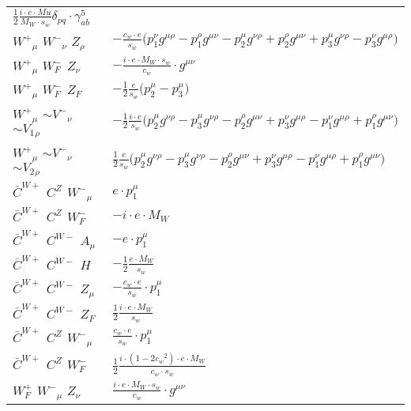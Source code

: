 \begin{center}
\begin{tabular}{|l|l|}
	$\frac{1}{2}\frac{ i \cdot e \cdot Mu}{ M_W \cdot s_w}\delta_{p q} \cdot \gamma_{a b}^5 $\\[2mm]
$W^+{}_{\mu }$ \phantom{-} $W^-{}_{\nu }$ \phantom{-} ${Z}_{\rho }$ \phantom{-}  &
	$-\frac{ c_w \cdot e}{ s_w}\big(p_1^\nu g^{\mu \rho} -p_1^\rho g^{\mu \nu} -p_2^\mu g^{\nu \rho} +p_2^\rho g^{\mu \nu} +p_3^\mu g^{\nu \rho} -p_3^\nu g^{\mu \rho} \big)$\\[2mm]
$W^+{}_{\mu }$ \phantom{-} $W^-_F{}_{}$ \phantom{-} ${Z}_{\nu }$ \phantom{-}  &
	$-\frac{ i \cdot e \cdot M_W \cdot s_w}{ c_w}\cdot g^{\mu \nu} $\\[2mm]
$W^+{}_{\mu }$ \phantom{-} $W^-_F{}_{}$ \phantom{-} $Z_F{}_{}$ \phantom{-}  &
	$-\frac{1}{2}\frac{ e}{ s_w}\big(p_2^\mu -p_3^\mu \big)$\\[2mm]
$W^+{}_{\mu }$ \phantom{-} $\sim V^-{}_{\nu }$ \phantom{-} $\sim V_1{}_{\rho }$ \phantom{-}  &
	$-\frac{1}{2}\frac{ i \cdot e}{ s_w}\big(p_2^\mu g^{\nu \rho} -p_3^\mu g^{\nu \rho} -p_2^\rho g^{\mu \nu} +p_3^\nu g^{\mu \rho} -p_1^\nu g^{\mu \rho} +p_1^\rho g^{\mu \nu} \big)$\\[2mm]
$W^+{}_{\mu }$ \phantom{-} $\sim V^-{}_{\nu }$ \phantom{-} $\sim V_2{}_{\rho }$ \phantom{-}  &
	$\frac{1}{2}\frac{ e}{ s_w}\big(p_2^\mu g^{\nu \rho} -p_3^\mu g^{\nu \rho} -p_2^\rho g^{\mu \nu} +p_3^\nu g^{\mu \rho} -p_1^\nu g^{\mu \rho} +p_1^\rho g^{\mu \nu} \big)$\\[2mm]
$\bar{C}^{W+}{}_{}$ \phantom{-} $C^{Z}{}_{}$ \phantom{-} $W^-{}_{\mu }$ \phantom{-}  &
	$ e\cdot p_1^\mu $\\[2mm]
$\bar{C}^{W+}{}_{}$ \phantom{-} $C^{Z}{}_{}$ \phantom{-} $W^-_F{}_{}$ \phantom{-}  &
	$- i \cdot e \cdot M_W$\\[2mm]
$\bar{C}^{W+}{}_{}$ \phantom{-} $C^{W-}{}_{}$ \phantom{-} ${A}_{\mu }$ \phantom{-}  &
	$- e\cdot p_1^\mu $\\[2mm]
$\bar{C}^{W+}{}_{}$ \phantom{-} $C^{W-}{}_{}$ \phantom{-} ${H}_{}$ \phantom{-}  &
	$-\frac{1}{2}\frac{ e \cdot M_W}{ s_w}$\\[2mm]
$\bar{C}^{W+}{}_{}$ \phantom{-} $C^{W-}{}_{}$ \phantom{-} ${Z}_{\mu }$ \phantom{-}  &
	$-\frac{ c_w \cdot e}{ s_w}\cdot p_1^\mu $\\[2mm]
$\bar{C}^{W+}{}_{}$ \phantom{-} $C^{W-}{}_{}$ \phantom{-} $Z_F{}_{}$ \phantom{-}  &
	$\frac{1}{2}\frac{ i \cdot e \cdot M_W}{ s_w}$\\[2mm]
$\bar{C}^{W+}{}_{}$ \phantom{-} $C^{Z}{}_{}$ \phantom{-} $W^-{}_{\mu }$ \phantom{-}  &
	$\frac{ c_w \cdot e}{ s_w}\cdot p_1^\mu $\\[2mm]
$\bar{C}^{W+}{}_{}$ \phantom{-} $C^{Z}{}_{}$ \phantom{-} $W^-_F{}_{}$ \phantom{-}  &
	$\frac{1}{2}\frac{ i \cdot (1-2 c_w {}^2) \cdot e \cdot M_W}{ c_w \cdot s_w}$\\[2mm]
$W^+_F{}_{}$ \phantom{-} $W^-{}_{\mu }$ \phantom{-} ${Z}_{\nu }$ \phantom{-}  &
	$\frac{ i \cdot e \cdot M_W \cdot s_w}{ c_w}\cdot g^{\mu \nu} $\\ \hline
\end{tabular}


\end{center}
